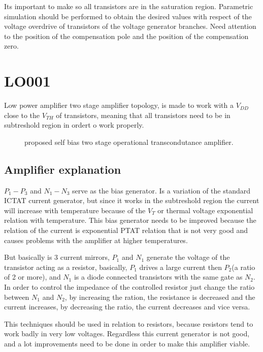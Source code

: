 \documentclass[12pt]{article}
\begin{document}
Its important to make so all transistors are in the saturation region.  Parametric simulation should be performed to obtain the desired values with respect of the voltage overdrive of transistors of the voltage generator branches. Need attention to the position of the compensation pole and the position of the compensation zero.







\section{LO001}
Low power amplifier two stage amplifier topology, is made to work with a $V_{DD}$ close to the $V_{TH}$ of transistors, meaning that all transistors need to be in subtreshold region in ordert o work properly.
\begin{figure}[H]
        \centering
        
        \caption{proposed self bias two stage operational transcondutance amplifier.}
        \label{OP}
\end{figure}
\subsection{Amplifier explanation}


$P_1-P_3$ and $N_1-N_3$ serve as the bias generator. Is a variation of the standard ICTAT current generator, but since it works in the subtreshold region the current will increase with temperature because of the $V_T$ or thermal voltage exponential relation with temperature. This bias generator needs to be improved because the relation of the current is exponential PTAT relation that is not very good and causes problems with the amplifier at higher temperatures.

But basically is 3 current mirrors, $P_1$ and $N_1$ generate the voltage of the transistor acting as a resistor, basically, $P_1$ drives a large current then $P_2$(a ratio of 2 or more), and $N_1$ is a diode connected transistors with the same gate as $N_2$. In order to control the impedance of the controlled resistor just change the ratio between $N_1$ and $N_2$, by increasing the ration, the resistance is decreased and the current increases, by decreasing the ratio, the current decreases and vice versa.

This techniques should be used in relation to resistors, because resistors tend to work badly in very low voltages. Regardless this current generator is not good, and a lot improvements need to be done in order to make this amplifier viable.
\end{document}
